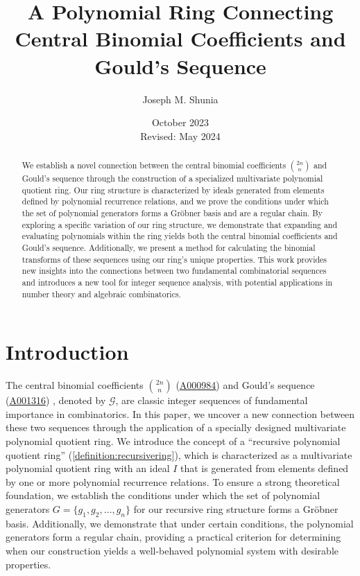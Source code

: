 \documentclass[12pt,reqno]{article}
\theoremstyle{plain}
\newcommand{\Goulds}{\mathcal{G}}
\newcommand{\seqnum}[1]{\href{https://oeis.org/#1}{\rm \underline{#1}}}
\begin{document}
\title{A Polynomial Ring Connecting Central Binomial Coefficients and Gould's Sequence}
\author{Joseph M. Shunia}
\date{October 2023 \\ \small Revised: May 2024 \normalsize}
\maketitle

\begin{abstract}
We establish a novel connection between the central binomial coefficients $\binom{2n}{n}$ and Gould's sequence through the construction of a specialized multivariate polynomial quotient ring. Our ring structure is characterized by ideals generated from elements defined by polynomial recurrence relations, and we prove the conditions under which the set of polynomial generators forms a Gr\"obner basis and are a regular chain. By exploring a specific variation of our ring structure, we demonstrate that expanding and evaluating polynomials within the ring yields both the central binomial coefficients and Gould's sequence. Additionally, we present a method for calculating the binomial transforms of these sequences using our ring's unique properties. This work provides new insights into the connections between two fundamental combinatorial sequences and introduces a new tool for integer sequence analysis, with potential applications in number theory and algebraic combinatorics.
\end{abstract}

\section{Introduction}
The central binomial coefficients $\binom{2n}{n}$ (\seqnum{A000984}) \cite{A000984} and Gould's sequence (\seqnum{A001316}) \cite{A001316}, denoted by $\Goulds$, are classic integer sequences of fundamental importance in combinatorics. In this paper, we uncover a new connection between these two sequences through the application of a specially designed multivariate polynomial quotient ring. We introduce the concept of a ``recursive polynomial quotient ring'' (\cref{definition:recursivering}), which is characterized as a multivariate polynomial quotient ring with an ideal $I$ that is generated from elements defined by one or more polynomial recurrence relations. To ensure a strong theoretical foundation, we establish the conditions under which the set of polynomial generators $G = \{ g_1, g_2, \ldots, g_n \}$ for our recursive ring structure forms a Gröbner basis. Additionally, we demonstrate that under certain conditions, the polynomial generators form a regular chain, providing a practical criterion for determining when our construction yields a well-behaved polynomial system with desirable properties.
\end{document}
